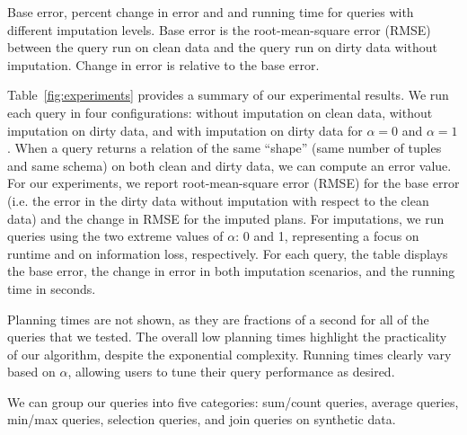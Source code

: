 \begin{table*}
  \centerfloat
  
    \caption{Base error, percent change in error and and running time for queries
    with different imputation levels. Base error is the root-mean-square error (RMSE) between the query run on clean
    data and the query run on dirty data without imputation. Change in error is relative to the base error.}
  \label{fig:experiments}
\end{table*}

Table~\ref{fig:experiments} provides a summary of our experimental results.
We run each query in four configurations: without imputation on clean data, without imputation on dirty data, and with imputation on dirty data for $\alpha = 0$ and $\alpha = 1$.
When a query returns a relation of the same ``shape'' (same number of tuples and same schema) on both clean and dirty data, we can compute an error value.
For our experiments, we report root-mean-square error (RMSE) for the base error (i.e. the error in the dirty data without imputation with respect to the clean data) and the change
in RMSE for the imputed plans.
For imputations, we run queries using the two extreme values of $\alpha$: 0 and 1, representing a focus on runtime and on information loss, respectively.
For each query, the table displays the base error, the change in error in both imputation scenarios, and the running time in seconds.

Planning times are not shown, as they are fractions of a second for all of the queries that we tested.
The overall low planning times highlight the practicality of our algorithm, despite the exponential complexity.
Running times clearly vary based on $\alpha$, allowing users to tune their query performance as desired.

We can group our queries into five categories: sum/count queries, average queries, min/max queries, selection queries, and join queries on synthetic data.

